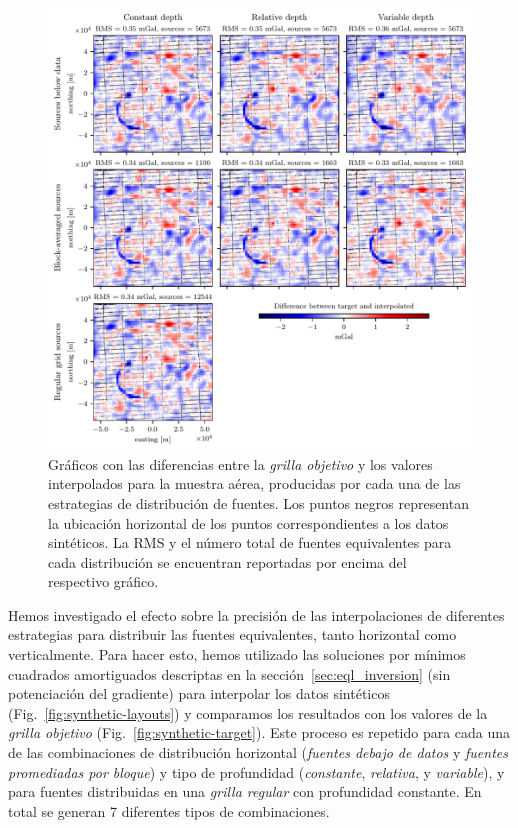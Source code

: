 \begin{figure}[p]
    \includegraphics[width=\linewidth]{figs/eql-gradient-boosted/airborne_survey_differences.pdf}
    \caption{
        Gráficos con las diferencias entre la \emph{grilla objetivo} y los
        valores interpolados para la muestra aérea, producidas por
        cada una de las estrategias de distribución de fuentes.
        Los puntos negros representan la ubicación horizontal de los puntos
        correspondientes a los datos sintéticos.
        La \acs{RMS} y el número total de fuentes equivalentes para cada
        distribución se encuentran reportadas por encima del respectivo
        gráfico.
    }
    \label{fig:airborne-survey-differences}
\end{figure}

Hemos investigado el efecto sobre la precisión de las interpolaciones de
diferentes estrategias para distribuir las fuentes equivalentes, tanto
horizontal como verticalmente.
Para hacer esto, hemos utilizado las soluciones por mínimos cuadrados
amortiguados descriptas en la sección~\ref{sec:eql_inversion} (sin potenciación
del gradiente) para interpolar los datos sintéticos
(Fig.~\ref{fig:synthetic-layouts}) y comparamos los resultados con los valores
de la \emph{grilla objetivo} (Fig.~\ref{fig:synthetic-target}).
Este proceso es repetido para cada una de las combinaciones de distribución
horizontal (\emph{fuentes debajo de datos} y \emph{fuentes promediadas por
bloque}) y tipo de profundidad (\emph{constante}, \emph{relativa},
y \emph{variable}), y para fuentes distribuidas en una \emph{grilla regular}
con profundidad constante.
En total se generan 7 diferentes tipos de combinaciones.

